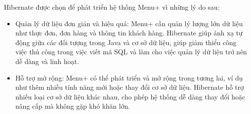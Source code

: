 \begin{enumerate}[(a)]
\begin{itemize}
        Hibernate được chọn để phát triển hệ thống Menu+ vì những lý do sau:

            \begin{itemize} 
                \item Quản lý dữ liệu đơn giản và hiệu quả: Menu+ cần quản lý lượng lớn dữ liệu như thực đơn, đơn hàng và thông tin khách hàng. Hibernate giúp ánh xạ tự động giữa các đối tượng trong Java và cơ sở dữ liệu, giúp giảm thiểu công việc thủ công trong việc viết mã SQL và làm cho việc quản lý dữ liệu trở nên dễ dàng và linh hoạt.
                \item Hỗ trợ mở rộng: Menu+ có thể phát triển và mở rộng trong tương lai, ví dụ như thêm nhiều tính năng mới hoặc thay đổi cơ sở dữ liệu. Hibernate hỗ trợ nhiều loại cơ sở dữ liệu khác nhau, cho phép hệ thống dễ dàng thay đổi hoặc nâng cấp mà không gặp khó khăn lớn.
            \end{itemize}
        \end{itemize}
        

    \end{enumerate}


